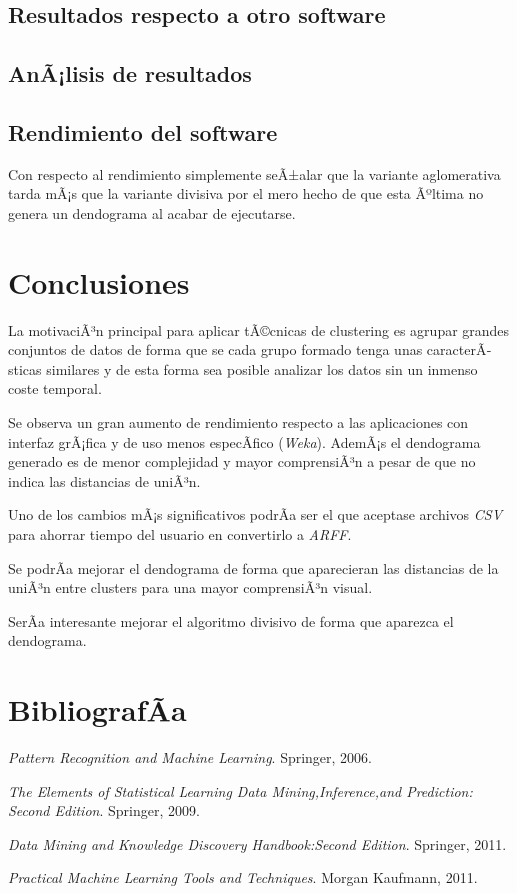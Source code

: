 \documentclass[11pt, titlepage,a4paper]{article}
\begin{document}
\subsection{Resultados respecto a otro software}

\subsection{AnÃ¡lisis de resultados}


\subsection{Rendimiento del software}
Con respecto al rendimiento simplemente seÃ±alar que la variante aglomerativa
tarda mÃ¡s que la variante divisiva por el mero hecho de que esta Ãºltima no
genera un dendograma al acabar de ejecutarse.

\section{Conclusiones}
La motivaciÃ³n principal para aplicar tÃ©cnicas de clustering es agrupar grandes
conjuntos de datos de forma que se cada grupo formado tenga unas caracterÃ­sticas similares y de esta forma sea posible analizar los datos sin un inmenso coste temporal.

Se observa un gran aumento de rendimiento respecto a las aplicaciones con
interfaz grÃ¡fica y de uso menos especÃ­fico (\textit{Weka}). AdemÃ¡s el dendograma generado es de menor complejidad y mayor comprensiÃ³n a pesar de que no indica las distancias de uniÃ³n.

Uno de los cambios mÃ¡s significativos podrÃ­a ser el que aceptase archivos
\textit{CSV} para ahorrar tiempo del usuario en convertirlo a \textit{ARFF}.
 
Se podrÃ­a mejorar el dendograma de forma que aparecieran las distancias de la
uniÃ³n entre clusters para una mayor comprensiÃ³n visual. 

SerÃ­a interesante mejorar el algoritmo divisivo de forma que aparezca el
dendograma.

\section{BibliografÃ­a}
\renewcommand{\refname}{\ }

\begin{thebibliography}{1}
	
	{\em Pattern Recognition and Machine Learning}.
	\newblock Springer, 2006.
	
	{\em The Elements of Statistical Learning Data Mining,Inference,and Prediction:
		Second Edition}.
	\newblock Springer, 2009.
	
	{\em Data Mining and Knowledge Discovery Handbook:Second Edition}.
	\newblock Springer, 2011.
	
	{\em Practical Machine Learning Tools and Techniques}.
	\newblock Morgan Kaufmann, 2011.
	
\end{thebibliography}
\end{document}
